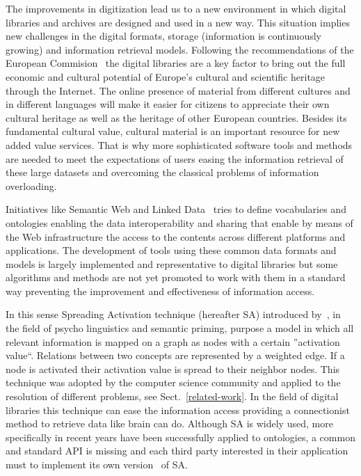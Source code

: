 The improvements in digitization lead us to a new environment in which digital libraries and archives are designed and used
in a new way. This situation implies new challenges in the digital formats, storage (information is continuously growing) and
information retrieval models. Following the recommendations of the European Commision~\cite{DigitalLibraries} the digital libraries are
a key factor to bring out the full economic and cultural potential of Europe’s cultural and scientific heritage 
through the Internet. The online presence of material from different cultures and in different languages will
make it easier for citizens to appreciate their own cultural heritage as well as the heritage
of other European countries. Besides its fundamental cultural value, cultural material is an important resource for new
added value services. That is why more sophisticated software tools and methods are needed to meet the expectations of users easing
the information retrieval of these large datasets and overcoming the classical problems of information overloading. 

Initiatives like Semantic Web and Linked Data~\cite{LinkedData} tries to define vocabularies and ontologies enabling
the data interoperability and sharing that enable by means of the Web infrastructure the access
to the contents across different platforms and applications. The development of tools using these common
data formats and models is largely implemented and representative to digital libraries
but some algorithms and methods are not yet promoted to work with them in a standard way preventing 
the improvement and effectiveness of information access. 

In this sense Spreading Activation technique (hereafter SA) introduced by~\cite{Collins_Loftus_1975}, in the field of 
psycho linguistics and semantic priming, purpose a model in which all relevant information is mapped
on a graph as nodes with a certain ''activation value``. Relations between two concepts
are represented by a weighted edge. If a node is activated their activation value is spread
to their neighbor nodes. This technique was adopted by the computer science community and applied
to the resolution of different problems, see Sect.~\ref{related-work}. In the field of digital libraries
this technique can ease the information access providing a connectionist method to retrieve data like
brain can do. Although SA is widely used, more specifically in recent years have been successfully applied 
to ontologies, a common and standard API is missing and each third party interested in their application
 must to implement its own version~\cite{SpreadingLarkc} of SA.


